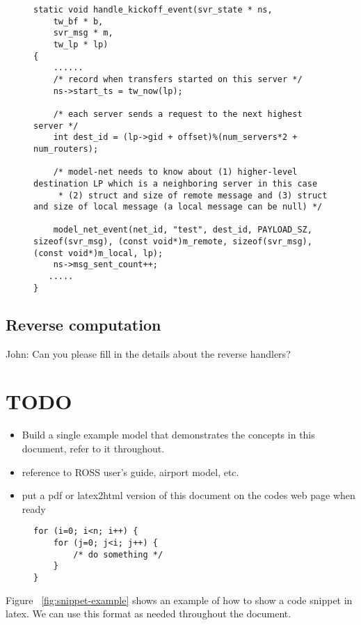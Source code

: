\documentclass[conference,10pt,compsocconf,onecolumn]{IEEEtran}
\begin{document}
\begin{figure}
\begin{lstlisting}[caption=Example code snippet showing data transfer through model-net API, label=snippet6]
static void handle_kickoff_event(svr_state * ns,
    tw_bf * b,
    svr_msg * m,
    tw_lp * lp)
{
    ......
    /* record when transfers started on this server */
    ns->start_ts = tw_now(lp);

    /* each server sends a request to the next highest server */
    int dest_id = (lp->gid + offset)%(num_servers*2 + num_routers);

    /* model-net needs to know about (1) higher-level destination LP which is a neighboring server in this case
     * (2) struct and size of remote message and (3) struct and size of local message (a local message can be null) */
    
    model_net_event(net_id, "test", dest_id, PAYLOAD_SZ, sizeof(svr_msg), (const void*)m_remote, sizeof(svr_msg), (const void*)m_local, lp);
    ns->msg_sent_count++;
   .....
}

\end{lstlisting}
\end{figure}
 
\subsection{Reverse computation}
John: Can you please fill in the details about the reverse handlers?

\section{TODO}

\begin{itemize}
\item Build a single example model that demonstrates the concepts in this
document, refer to it throughout.
\item reference to ROSS user's guide, airport model, etc.
\item put a pdf or latex2html version of this document on the codes web page
when ready
\end{itemize}

\begin{figure}
\begin{lstlisting}[caption=Example code snippet., label=snippet-example]
for (i=0; i<n; i++) {
    for (j=0; j<i; j++) {
        /* do something */
    }
}
\end{lstlisting}
\end{figure}

Figure ~\ref{fig:snippet-example} shows an example of how to show a code
snippet in latex.  We can use this format as needed throughout the document.
\end{document}
